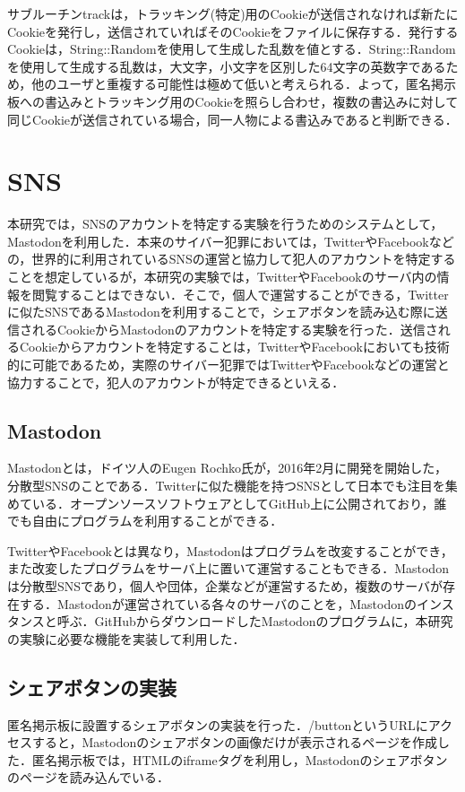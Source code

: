 \documentclass[10pt, a4paper]{jreport}
\begin{document}
サブルーチンtrackは，トラッキング(特定)用のCookieが送信されなければ新たにCookieを発行し，送信されていればそのCookieをファイルに保存する．発行するCookieは，String::Randomを使用して生成した乱数を値とする．String::Randomを使用して生成する乱数は，大文字，小文字を区別した64文字の英数字であるため，他のユーザと重複する可能性は極めて低いと考えられる．よって，匿名掲示板への書込みとトラッキング用のCookieを照らし合わせ，複数の書込みに対して同じCookieが送信されている場合，同一人物による書込みであると判断できる．

\section{SNS}\label{sec: sns}
本研究では，SNSのアカウントを特定する実験を行うためのシステムとして，Mastodonを利用した．本来のサイバー犯罪においては，TwitterやFacebookなどの，世界的に利用されているSNSの運営と協力して犯人のアカウントを特定することを想定しているが，本研究の実験では，TwitterやFacebookのサーバ内の情報を閲覧することはできない．そこで，個人で運営することができる，Twitterに似たSNSであるMastodonを利用することで，シェアボタンを読み込む際に送信されるCookieからMastodonのアカウントを特定する実験を行った．送信されるCookieからアカウントを特定することは，TwitterやFacebookにおいても技術的に可能であるため，実際のサイバー犯罪ではTwitterやFacebookなどの運営と協力することで，犯人のアカウントが特定できるといえる．

\subsection*{Mastodon}
Mastodonとは，ドイツ人のEugen Rochko氏が，2016年2月に開発を開始した，分散型SNSのことである．Twitterに似た機能を持つSNSとして日本でも注目を集めている．オープンソースソフトウェアとしてGitHub上に公開されており，誰でも自由にプログラムを利用することができる．

TwitterやFacebookとは異なり，Mastodonはプログラムを改変することができ，また改変したプログラムをサーバ上に置いて運営することもできる．Mastodonは分散型SNSであり，個人や団体，企業などが運営するため，複数のサーバが存在する．Mastodonが運営されている各々のサーバのことを，Mastodonのインスタンスと呼ぶ．GitHubからダウンロードしたMastodonのプログラムに，本研究の実験に必要な機能を実装して利用した．

\subsection{シェアボタンの実装}
匿名掲示板に設置するシェアボタンの実装を行った．/buttonというURLにアクセスすると，Mastodonのシェアボタンの画像だけが表示されるページを作成した．匿名掲示板では，HTMLのiframeタグを利用し，Mastodonのシェアボタンのページを読み込んでいる．
\end{document}

